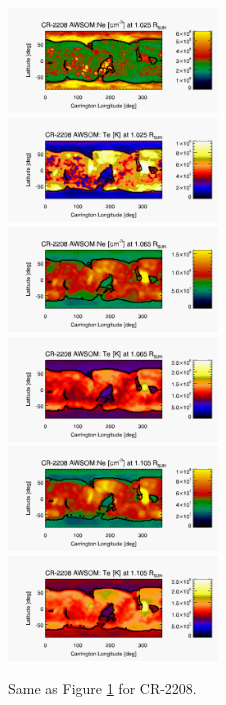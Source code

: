 \documentclass[namedreferences]{solarphysics}
\begin{document}
\begin{article}
\begin{figure}[h!]
\begin{center}
\includegraphics[width=0.495\textwidth]{figs/map_Ne_awsom_2208_185_short_1025_Rsun.pdf}
\includegraphics[width=0.495\textwidth]{figs/map_Te_awsom_2208_185_short_1025_Rsun.pdf}
\includegraphics[width=0.495\textwidth]{figs/map_Ne_awsom_2208_185_short_1065_Rsun.pdf}
\includegraphics[width=0.495\textwidth]{figs/map_Te_awsom_2208_185_short_1065_Rsun.pdf}
\includegraphics[width=0.495\textwidth]{figs/map_Ne_awsom_2208_185_short_1105_Rsun.pdf}
\includegraphics[width=0.495\textwidth]{figs/map_Te_awsom_2208_185_short_1105_Rsun.pdf}
\caption{Same as Figure \ref{carmaps_awsom_2208} for CR-2208.}
\label{carmaps_awsom_2208}
\end{center}
\end{figure}


\end{article}
\end{document}
